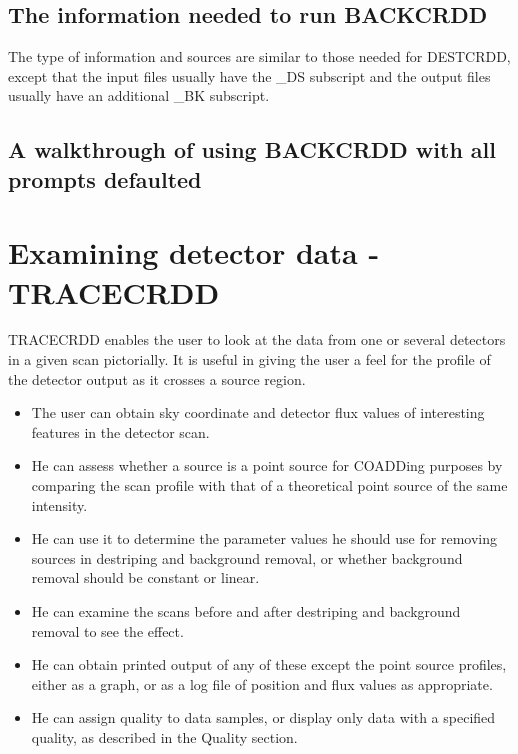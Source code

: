 \documentclass[twoside,11pt]{starlink}
\begin{document}
\subsection{The information needed to run BACKCRDD}
The type of information and sources are similar to those needed for DESTCRDD,
except that the  input files usually have the \_DS subscript and the output
files usually have an additional \_BK subscript.
\subsection{A walkthrough of using BACKCRDD with all prompts defaulted}
\begin{small}
\end{small}

\section{Examining detector data - TRACECRDD
\label{m:tracecrdd}}

TRACECRDD enables the user to look at the data from one or several detectors
in a given scan pictorially. It is useful in giving the user a feel for the
profile of the detector output as it crosses a source region.
\begin{itemize}
\item The user can obtain sky coordinate and detector flux values of
interesting features in the detector scan.
\item He can assess whether a source is a point source for COADDing
purposes by comparing the scan profile with that of a theoretical point source
of the  same intensity.
\item He can use it to determine the parameter values he should use for
removing sources in destriping and background removal, or whether background
removal should be constant or linear.
\item He can examine the scans before and after destriping and background
removal to see the effect.
\item He can obtain printed output of any of these except the point source
profiles, either as a graph, or as  a log file of position and flux values as
appropriate.
\item He can assign quality to data samples, or display only data with a
specified quality, as described in the Quality section.
\end{itemize}
\end{document}
